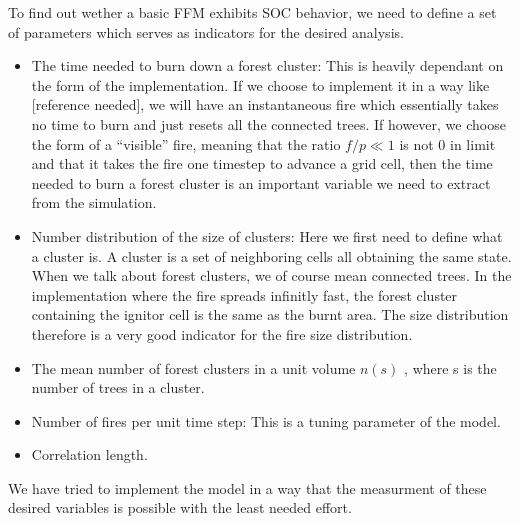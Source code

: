 \documentclass[11pt]{article}
\begin{document}
To find out wether a basic FFM exhibits SOC behavior, we need to define a set of parameters which serves as indicators for the desired analysis. 
\begin{itemize}

\item The time needed to burn down a forest cluster: This is heavily dependant on the form of the implementation. If we choose to implement it in a way like [reference needed], we will have an instantaneous fire which essentially takes no time to burn and just resets all the connected trees. If however, we choose the form of a “visible” fire, meaning that the ratio $f/p\ll1$  is not 0  in limit and that it takes the fire one timestep to advance a grid cell, then the time needed to burn a forest cluster is an important variable we need to extract from the simulation.

\item Number distribution of the size of clusters: Here we first need to define what a cluster is. A cluster is a set of neighboring cells all obtaining the same state. When we talk about forest clusters, we of course mean connected trees. In the implementation where the fire spreads infinitly fast, the forest cluster containing the ignitor cell is the same as the burnt area. The size distribution therefore is a very good indicator for the fire size distribution. 

\item The mean number of forest clusters in a unit volume $n(s)$ , where s  is the number of trees in a cluster. 

\item Number of fires per unit time step: This is a tuning parameter of the model.

\item Correlation length.
\end{itemize}
We have tried to implement the model in a way that the measurment of these desired variables is possible with the least needed effort.
\end{document}
